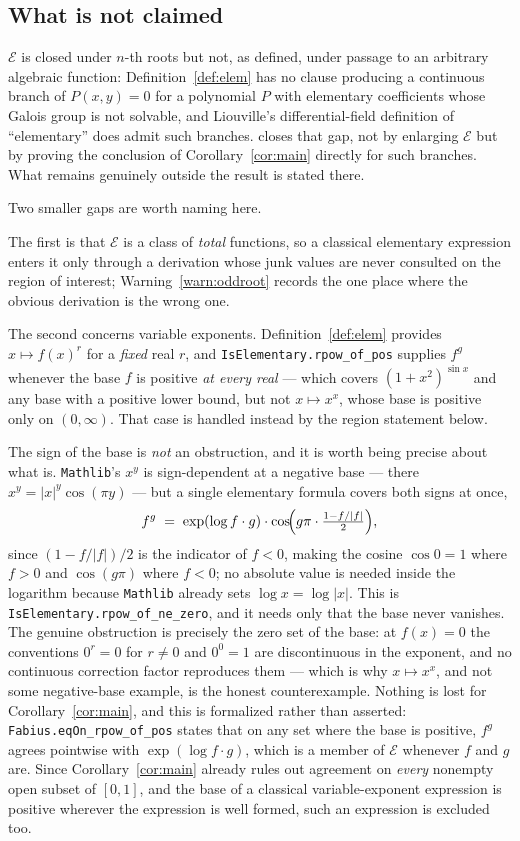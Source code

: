 \documentclass[11pt,oneside]{article}
\theoremstyle{definition}
\theoremstyle{remark}
\newcommand{\Elem}{\mathcal E}
\begin{document}
\subsection{What is not claimed}\label{sec:notclaimed}

$\Elem$ is closed under $n$-th roots but not, as defined, under passage to an
arbitrary algebraic function: Definition~\ref{def:elem} has no clause producing a
continuous branch of $P(x,y)=0$ for a polynomial $P$ with elementary
coefficients whose Galois group is not solvable, and Liouville's
differential-field definition of ``elementary'' does admit such branches.
 closes that gap, not by enlarging $\Elem$ but by proving
the conclusion of Corollary~\ref{cor:main} directly for such branches.  What
remains genuinely outside the result is stated there.

Two smaller gaps are worth naming here.

The first is that $\Elem$ is a class of \emph{total} functions, so a classical
elementary expression enters it only through a derivation whose junk values
are never consulted on the region of interest; Warning~\ref{warn:oddroot}
records the one place where the obvious derivation is the wrong one.

The second concerns variable exponents.  Definition~\ref{def:elem}
provides $x\mapsto f(x)^r$ for a \emph{fixed} real $r$, and
\texttt{IsElementary.rpow\_of\_pos} supplies $f^g$ whenever the base $f$ is
positive \emph{at every real} --- which covers $(1+x^2)^{\sin x}$ and any base
with a positive lower bound, but not $x\mapsto x^x$, whose base is positive
only on $(0,\infty)$.  That case is handled instead by the region statement
below.

The sign of the base is \emph{not} an obstruction, and it is worth being
precise about what is.  \texttt{Mathlib}'s $x^y$ is sign-dependent at a
negative base --- there $x^y=|x|^y\cos(\pi y)$ --- but a single elementary
formula covers both signs at once,
\[
  f^{g}\;=\;\exp(\log f\cdot g)\cdot
           \cos\!\Bigl(g\pi\cdot\tfrac{1-f/|f|}{2}\Bigr),
\]
since $(1-f/|f|)/2$ is the indicator of $f<0$, making the cosine $\cos 0=1$
where $f>0$ and $\cos(g\pi)$ where $f<0$; no absolute value is needed inside
the logarithm because \texttt{Mathlib} already sets $\log x=\log|x|$.  This is
\texttt{IsElementary.rpow\_of\_ne\_zero}, and it needs only that the base never
vanishes.  The genuine obstruction is precisely the zero set of the base: at
$f(x)=0$ the conventions $0^r=0$ for $r\ne0$ and $0^0=1$ are discontinuous in
the exponent, and no continuous correction factor reproduces them --- which is
why $x\mapsto x^x$, and not some negative-base example, is the honest
counterexample.  Nothing is lost for Corollary~\ref{cor:main}, and this is
formalized rather than asserted: \texttt{Fabius.eqOn\_rpow\_of\_pos}
states that on any set where the base is positive, $f^{g}$ agrees pointwise
with $\exp(\log f\cdot g)$, which is a member of $\Elem$ whenever $f$ and $g$
are.  Since Corollary~\ref{cor:main} already rules out agreement on \emph{every}
nonempty open subset of $[0,1]$, and the base of a classical
variable-exponent expression is positive wherever the expression is well
formed, such an expression is excluded too.
\end{document}
